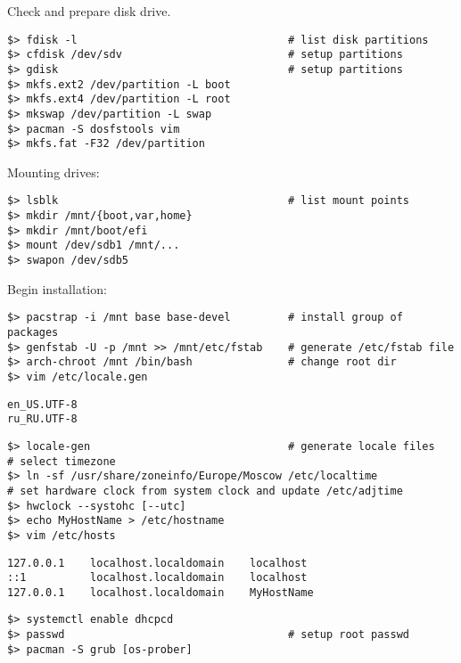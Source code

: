\documentclass[a4paper, 12pt]{article}
\begin{document}
Check and prepare disk drive.
\begin{lstlisting}
$> fdisk -l                                 # list disk partitions
$> cfdisk /dev/sdv                          # setup partitions
$> gdisk                                    # setup partitions
$> mkfs.ext2 /dev/partition -L boot
$> mkfs.ext4 /dev/partition -L root
$> mkswap /dev/partition -L swap
$> pacman -S dosfstools vim
$> mkfs.fat -F32 /dev/partition
\end{lstlisting}

Mounting drives:
\begin{lstlisting}
$> lsblk                                    # list mount points
$> mkdir /mnt/{boot,var,home}
$> mkdir /mnt/boot/efi
$> mount /dev/sdb1 /mnt/...
$> swapon /dev/sdb5
\end{lstlisting}

Begin installation:
\begin{lstlisting}
$> pacstrap -i /mnt base base-devel         # install group of packages
$> genfstab -U -p /mnt >> /mnt/etc/fstab    # generate /etc/fstab file
$> arch-chroot /mnt /bin/bash               # change root dir
$> vim /etc/locale.gen
\end{lstlisting}

\begin{lstlisting}[style=style_file,caption={/etc/locale.gen uncomment:}]
en_US.UTF-8
ru_RU.UTF-8
\end{lstlisting}

\begin{lstlisting}
$> locale-gen                               # generate locale files
# select timezone
$> ln -sf /usr/share/zoneinfo/Europe/Moscow /etc/localtime
# set hardware clock from system clock and update /etc/adjtime
$> hwclock --systohc [--utc]
$> echo MyHostName > /etc/hostname
$> vim /etc/hosts
\end{lstlisting}

\begin{lstlisting}[style=style_file,caption={/etc/hosts add lines:}]
127.0.0.1    localhost.localdomain    localhost
::1          localhost.localdomain    localhost
127.0.0.1    localhost.localdomain    MyHostName
\end{lstlisting}

\begin{lstlisting}
$> systemctl enable dhcpcd
$> passwd                                   # setup root passwd
$> pacman -S grub [os-prober]
\end{lstlisting}
\end{document}

